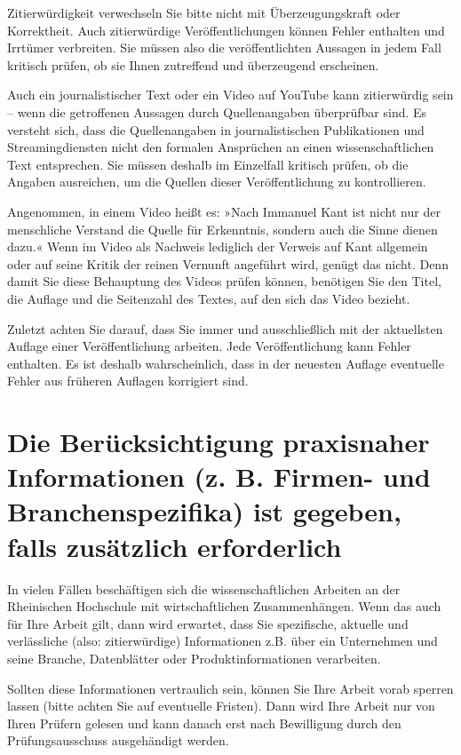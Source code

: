 Zitierwürdigkeit verwechseln Sie bitte nicht mit Überzeugungskraft oder Korrektheit. Auch zitierwürdige Veröffentlichungen können Fehler enthalten und Irrtümer verbreiten. Sie müssen also die veröffentlichten Aussagen in jedem Fall kritisch prüfen, ob sie Ihnen zutreffend und überzeugend erscheinen.

Auch ein journalistischer Text oder ein Video auf YouTube kann zitierwürdig sein – wenn die getroffenen Aussagen durch Quellenangaben überprüfbar sind. Es versteht sich, dass die Quellenangaben in journalistischen Publikationen und Streamingdiensten nicht den formalen Ansprüchen an einen wissenschaftlichen Text entsprechen. Sie müssen deshalb im Einzelfall kritisch prüfen, ob die Angaben ausreichen, um die Quellen dieser Veröffentlichung zu kontrollieren.

Angenommen, in einem Video heißt es: »Nach Immanuel Kant ist nicht nur der menschliche Verstand die Quelle für Erkenntnis, sondern auch die Sinne dienen dazu.« Wenn im Video als Nachweis lediglich der Verweis auf Kant allgemein oder auf seine Kritik der reinen Vernunft angeführt wird, genügt das nicht. Denn damit Sie diese Behauptung des Videos prüfen können, benötigen Sie den Titel, die Auflage und die Seitenzahl des Textes, auf den sich das Video bezieht.

Zuletzt achten Sie darauf, dass Sie immer und ausschließlich mit der aktuellsten Auflage einer Veröffentlichung arbeiten. Jede Veröffentlichung kann Fehler enthalten. Es ist deshalb wahrscheinlich, dass in der neuesten Auflage eventuelle Fehler aus früheren Auflagen korrigiert sind.

\section{Die Berücksichtigung praxisnaher Informationen (z. B. Firmen- und Branchenspezifika) ist gegeben, falls zusätzlich erforderlich}
\label{sec:praxisnahe-informationen}

In vielen Fällen beschäftigen sich die wissenschaftlichen Arbeiten an der Rheinischen Hochschule mit wirtschaftlichen Zusammenhängen. Wenn das auch für Ihre Arbeit gilt, dann wird erwartet, dass Sie spezifische, aktuelle und verlässliche (also: zitierwürdige) Informationen z.B. über ein Unternehmen und seine Branche, Datenblätter oder Produktinformationen verarbeiten.

Sollten diese Informationen vertraulich sein, können Sie Ihre Arbeit vorab sperren lassen (bitte achten Sie auf eventuelle Fristen). Dann wird Ihre Arbeit nur von Ihren Prüfern gelesen und kann danach erst nach Bewilligung durch den Prüfungsausschuss ausgehändigt werden.

